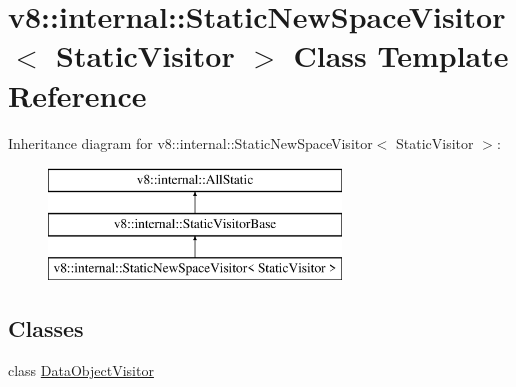 \hypertarget{classv8_1_1internal_1_1_static_new_space_visitor}{}\section{v8\+:\+:internal\+:\+:Static\+New\+Space\+Visitor$<$ Static\+Visitor $>$ Class Template Reference}
\label{classv8_1_1internal_1_1_static_new_space_visitor}
Inheritance diagram for v8\+:\+:internal\+:\+:Static\+New\+Space\+Visitor$<$ Static\+Visitor $>$\+:\begin{figure}[H]
\begin{center}
\leavevmode
\includegraphics[height=3.000000cm]{classv8_1_1internal_1_1_static_new_space_visitor}
\end{center}
\end{figure}
\subsection*{Classes}
\begin{DoxyCompactItemize}
\item 
class \hyperlink{classv8_1_1internal_1_1_static_new_space_visitor_1_1_data_object_visitor}{Data\+Object\+Visitor}
\end{DoxyCompactItemize}

